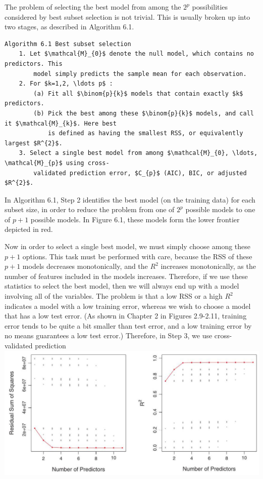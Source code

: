 \documentclass[10pt]{article}
\begin{document}
The problem of selecting the best model from among the $2^{p}$ possibilities considered by best subset selection is not trivial. This is usually broken up into two stages, as described in Algorithm 6.1.

\begin{verbatim}
Algorithm 6.1 Best subset selection
    1. Let $\mathcal{M}_{0}$ denote the null model, which contains no predictors. This
        model simply predicts the sample mean for each observation.
    2. For $k=1,2, \ldots p$ :
        (a) Fit all $\binom{p}{k}$ models that contain exactly $k$ predictors.
        (b) Pick the best among these $\binom{p}{k}$ models, and call it $\mathcal{M}_{k}$. Here best
            is defined as having the smallest RSS, or equivalently largest $R^{2}$.
    3. Select a single best model from among $\mathcal{M}_{0}, \ldots, \mathcal{M}_{p}$ using cross-
        validated prediction error, $C_{p}$ (AIC), BIC, or adjusted $R^{2}$.
\end{verbatim}

In Algorithm 6.1, Step 2 identifies the best model (on the training data) for each subset size, in order to reduce the problem from one of $2^{p}$ possible models to one of $p+1$ possible models. In Figure 6.1, these models form the lower frontier depicted in red.

Now in order to select a single best model, we must simply choose among these $p+1$ options. This task must be performed with care, because the RSS of these $p+1$ models decreases monotonically, and the $R^{2}$ increases monotonically, as the number of features included in the models increases. Therefore, if we use these statistics to select the best model, then we will always end up with a model involving all of the variables. The problem is that a low RSS or a high $R^{2}$ indicates a model with a low training error, whereas we wish to choose a model that has a low test error. (As shown in Chapter 2 in Figures 2.9-2.11, training error tends to be quite a bit smaller than test error, and a low training error by no means guarantees a low test error.) Therefore, in Step 3, we use cross-validated prediction\\
\includegraphics[max width=\textwidth, center]{2025_05_05_efe77898333945044de4g-221}
\end{document}
